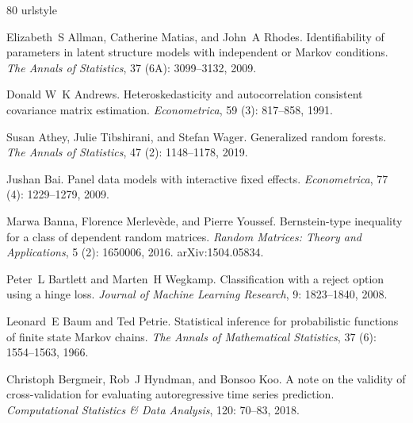 \begin{thebibliography}{80}
\setlength{\itemsep}{-4.0pt}
\footnotesize
\providecommand{\natexlab}[1]{#1}
\providecommand{\url}[1]{\texttt{#1}}
\expandafter\ifx\csname urlstyle\endcsname\relax
  \providecommand{\doi}[1]{doi: #1}\else
  \providecommand{\doi}{doi: \begingroup \urlstyle{rm}\Url}\fi

Elizabeth~S Allman, Catherine Matias, and John~A Rhodes.
\newblock Identifiability of parameters in latent structure models with independent or Markov conditions.
\newblock \emph{The Annals of Statistics}, 37 (6A): 3099--3132, 2009.

Donald W~K Andrews.
\newblock Heteroskedasticity and autocorrelation consistent covariance matrix estimation.
\newblock \emph{Econometrica}, 59 (3): 817--858, 1991.

Susan Athey, Julie Tibshirani, and Stefan Wager.
\newblock Generalized random forests.
\newblock \emph{The Annals of Statistics}, 47 (2): 1148--1178, 2019.

Jushan Bai.
\newblock Panel data models with interactive fixed effects.
\newblock \emph{Econometrica}, 77 (4): 1229--1279, 2009.

Marwa Banna, Florence Merlev{\`e}de, and Pierre Youssef.
\newblock Bernstein-type inequality for a class of dependent random matrices.
\newblock \emph{Random Matrices: Theory and Applications}, 5 (2): 1650006, 2016.
\newblock arXiv:1504.05834.

Peter~L Bartlett and Marten~H Wegkamp.
\newblock Classification with a reject option using a hinge loss.
\newblock \emph{Journal of Machine Learning Research}, 9: 1823--1840, 2008.

Leonard~E Baum and Ted Petrie.
\newblock Statistical inference for probabilistic functions of finite state {M}arkov chains.
\newblock \emph{The Annals of Mathematical Statistics}, 37 (6): 1554--1563, 1966.

Christoph Bergmeir, Rob~J Hyndman, and Bonsoo Koo.
\newblock A note on the validity of cross-validation for evaluating autoregressive time series prediction.
\newblock \emph{Computational Statistics \& Data Analysis}, 120: 70--83, 2018.


\end{thebibliography}
